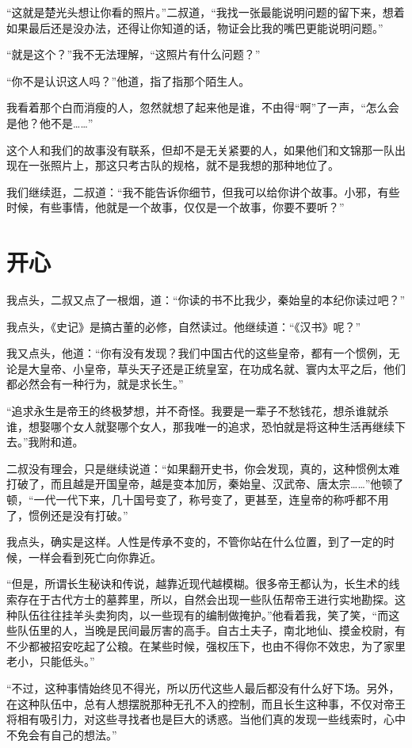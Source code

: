 “这就是楚光头想让你看的照片。”二叔道，“我找一张最能说明问题的留下来，想着如果最后还是没办法，还得让你知道的话，物证会比我的嘴巴更能说明问题。”

“就是这个？”我不无法理解，“这照片有什么问题？”

“你不是认识这人吗？”他道，指了指那个陌生人。

我看着那个白而消瘦的人，忽然就想了起来他是谁，不由得“啊”了一声，“怎么会是他？他不是……”

这个人和我们的故事没有联系，但却不是无关紧要的人，如果他们和文锦那一队出现在一张照片上，那这只考古队的规格，就不是我想的那种地位了。

我们继续逛，二叔道：“我不能告诉你细节，但我可以给你讲个故事。小邪，有些时候，有些事情，他就是一个故事，仅仅是一个故事，你要不要听？”

\chapter{开心}

我点头，二叔又点了一根烟，道：“你读的书不比我少，秦始皇的本纪你读过吧？”

我点头，《史记》是搞古董的必修，自然读过。他继续道：“《汉书》呢？”

我又点头，他道：“你有没有发现？我们中国古代的这些皇帝，都有一个惯例，无论是大皇帝、小皇帝，草头天子还是正统皇室，在功成名就、寰内太平之后，他们都必然会有一种行为，就是求长生。”

“追求永生是帝王的终极梦想，并不奇怪。我要是一辈子不愁钱花，想杀谁就杀谁，想娶哪个女人就娶哪个女人，那我唯一的追求，恐怕就是将这种生活再继续下去。”我附和道。

二叔没有理会，只是继续说道：“如果翻开史书，你会发现，真的，这种惯例太难打破了，而且越是开国皇帝，越是变本加厉，秦始皇、汉武帝、唐太宗……”他顿了顿，“一代一代下来，几十国号变了，称号变了，更甚至，连皇帝的称呼都不用了，惯例还是没有打破。”

我点头，确实是这样。人性是传承不变的，不管你站在什么位置，到了一定的时候，一样会看到死亡向你靠近。

“但是，所谓长生秘诀和传说，越靠近现代越模糊。很多帝王都认为，长生术的线索存在于古代方士的墓葬里，所以，自然会出现一些队伍帮帝王进行实地勘探。这种队伍往往挂羊头卖狗肉，以一些现有的编制做掩护。”他看着我，笑了笑，“而这些队伍里的人，当晚是民间最厉害的高手。自古土夫子，南北地仙、摸金校尉，有不少都被招安吃起了公粮。在某些时候，强权压下，也由不得你不效忠，为了家里老小，只能低头。”

“不过，这种事情始终见不得光，所以历代这些人最后都没有什么好下场。另外，在这种队伍中，总有人想摆脱那种无孔不入的控制，而且长生这种事，不仅对帝王将相有吸引力，对这些寻找者也是巨大的诱惑。当他们真的发现一些线索时，心中不免会有自己的想法。”

